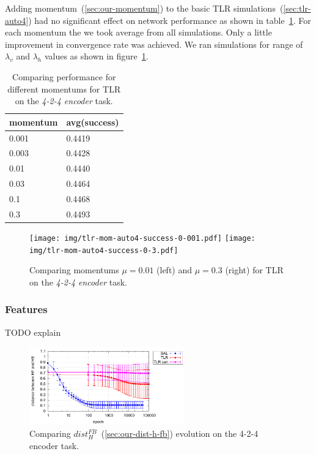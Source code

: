 Adding momentum~(\ref{sec:our-momentum}) to the basic TLR simulations~(\ref{sec:tlr-auto4}) had no significant effect on network performance as shown in table~\ref{tab:results-mom-auto4}. For each momentum the we took average from all simulations. Only a little improvement in convergence rate was achieved. We ran simulations for range of $\lambda_v$ and $\lambda_h$ values as shown in figure~\ref{fig:results-tlr-auto4-momentum}. 
\begin{table}[H] 
  \centering
  {\small
    \begin{tabular}{|l|l|}
    \hline
momentum & avg(success) \\
    \hline
0.001  & 0.4419 \\
    \hline
0.003  & 0.4428 \\
    \hline
0.01   & 0.4440 \\
    \hline
0.03   & 0.4464 \\
    \hline
0.1    & 0.4468 \\
    \hline
0.3    & 0.4493 \\
    \hline
    \end{tabular}
  }
  \caption{Comparing performance for different momentums for TLR on the \emph{4-2-4 encoder} task.} 
  \label{tab:results-mom-auto4}
\end{table}


\begin{figure}[H]
  \centering
  \texttt{[image: img/tlr-mom-auto4-success-0-001.pdf]}  
  \texttt{[image: img/tlr-mom-auto4-success-0-3.pdf]}  
   \caption{Comparing momentums $\mu=0.01$ (left) and $\mu=0.3$ (right) for TLR on the \emph{4-2-4 encoder} task.}
  \label{fig:results-tlr-auto4-momentum}
\end{figure}


\subsubsection{Features}
TODO explain 

\begin{figure}[H]
  \centering
  \includegraphics[width=0.6\textwidth]{img/feature-cmp-h-fb-d.pdf}  
   \caption{Comparing $dist_{H}^{FB}$~(\ref{sec:our-dist-h-fb}) evolution on the {4-2-4 encoder} task.}
  \label{fig:results-candidates-h-fb-d}
\end{figure}

